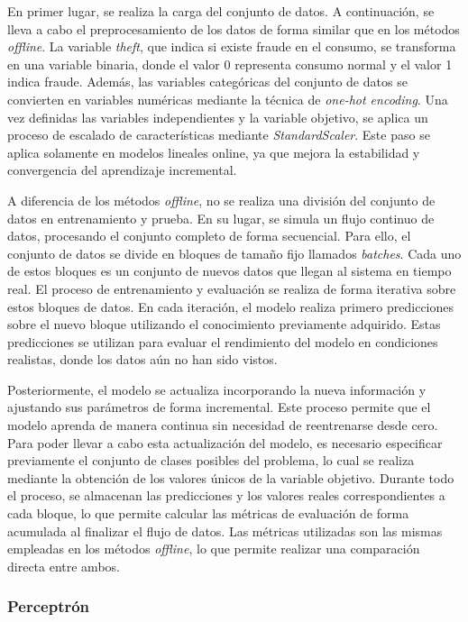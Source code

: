 \documentclass[12pt,a4paper]{report}
\begin{document}
En primer lugar, se realiza la carga del conjunto de datos. A continuación, se lleva a cabo el preprocesamiento de los datos de forma similar que en los métodos \emph{offline}. La variable \emph{theft}, que indica si existe fraude en el consumo, se transforma en una variable binaria, donde el valor 0 representa consumo normal y el valor 1 indica fraude. Además, las variables categóricas del conjunto de datos se convierten en variables numéricas mediante la técnica de \emph{one-hot encoding}. Una vez definidas las variables independientes y la variable objetivo, se aplica un proceso de escalado de características mediante \emph{StandardScaler}. Este paso se aplica solamente en modelos lineales online, ya que mejora la estabilidad y convergencia del aprendizaje incremental.

A diferencia de los métodos \emph{offline}, no se realiza una división del conjunto de datos en entrenamiento y prueba. En su lugar, se simula un flujo continuo de datos, procesando el conjunto completo de forma secuencial. Para ello, el conjunto de datos se divide en bloques de tamaño fijo llamados \emph{batches}. Cada uno de estos bloques es un conjunto de nuevos datos que llegan al sistema en tiempo real. El proceso de entrenamiento y evaluación se realiza de forma iterativa sobre estos bloques de datos. En cada iteración, el modelo realiza primero predicciones sobre el nuevo bloque utilizando el conocimiento previamente adquirido. Estas predicciones se utilizan para evaluar el rendimiento del modelo en condiciones realistas, donde los datos aún no han sido vistos.

Posteriormente, el modelo se actualiza incorporando la nueva información y ajustando sus parámetros de forma incremental. Este proceso permite que el modelo aprenda de manera continua sin necesidad de reentrenarse desde cero. Para poder llevar a cabo esta actualización del modelo, es necesario especificar previamente el conjunto de clases posibles del problema, lo cual se realiza mediante la obtención de los valores únicos de la variable objetivo. Durante todo el proceso, se almacenan las predicciones y los valores reales correspondientes a cada bloque, lo que permite calcular las métricas de evaluación de forma acumulada al finalizar el flujo de datos. Las métricas utilizadas son las mismas empleadas en los métodos \emph{offline}, lo que permite realizar una comparación directa entre ambos.


\subsubsection{Perceptrón}
\end{document}
